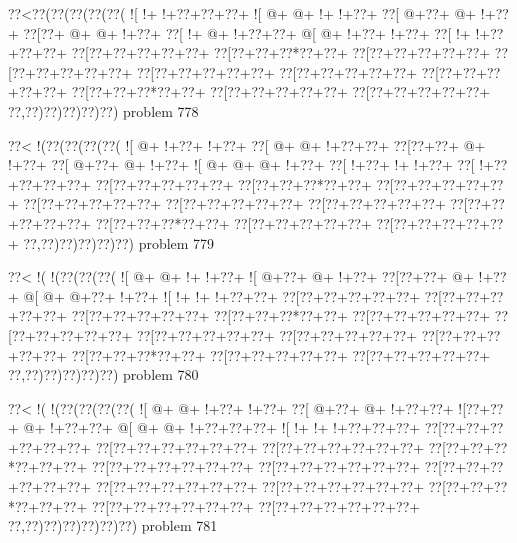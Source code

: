 \vbox{\vbox{\goo
\0??<\0??(\0??(\0??(\0??(\0??(
\- ![\- !+\- !+\0??+\0??+\0??+
\- ![\- @+\- @+\- !+\- !+\0??+
\0??[\- @+\0??+\- @+\- !+\0??+
\0??[\0??+\- @+\- @+\- !+\0??+
\0??[\- !+\- @+\- !+\0??+\0??+
\- @[\- @+\- !+\0??+\- !+\0??+
\0??[\- !+\- !+\0??+\0??+\0??+
\0??[\0??+\0??+\0??+\0??+\0??+
\0??[\0??+\0??+\0??*\0??+\0??+
\0??[\0??+\0??+\0??+\0??+\0??+
\0??[\0??+\0??+\0??+\0??+\0??+
\0??[\0??+\0??+\0??+\0??+\0??+
\0??[\0??+\0??+\0??+\0??+\0??+
\0??[\0??+\0??+\0??+\0??+\0??+
\0??[\0??+\0??+\0??*\0??+\0??+
\0??[\0??+\0??+\0??+\0??+\0??+
\0??[\0??+\0??+\0??+\0??+\0??+
\0??,\0??)\0??)\0??)\0??)\0??)
}
\hfil problem 778\hfil\break
}

\vbox{\vbox{\goo
\0??<\- !(\0??(\0??(\0??(\0??(
\- ![\- @+\- !+\0??+\- !+\0??+
\0??[\- @+\- @+\- !+\0??+\0??+
\0??[\0??+\0??+\- @+\- !+\0??+
\0??[\- @+\0??+\- @+\- !+\0??+
\- ![\- @+\- @+\- @+\- !+\0??+
\0??[\- !+\0??+\- !+\- !+\0??+
\0??[\- !+\0??+\0??+\0??+\0??+
\0??[\0??+\0??+\0??+\0??+\0??+
\0??[\0??+\0??+\0??*\0??+\0??+
\0??[\0??+\0??+\0??+\0??+\0??+
\0??[\0??+\0??+\0??+\0??+\0??+
\0??[\0??+\0??+\0??+\0??+\0??+
\0??[\0??+\0??+\0??+\0??+\0??+
\0??[\0??+\0??+\0??+\0??+\0??+
\0??[\0??+\0??+\0??*\0??+\0??+
\0??[\0??+\0??+\0??+\0??+\0??+
\0??[\0??+\0??+\0??+\0??+\0??+
\0??,\0??)\0??)\0??)\0??)\0??)
}
\hfil problem 779\hfil\break
}

\vbox{\vbox{\goo
\0??<\- !(\- !(\0??(\0??(\0??(
\- ![\- @+\- @+\- !+\- !+\0??+
\- ![\- @+\0??+\- @+\- !+\0??+
\0??[\0??+\0??+\- @+\- !+\0??+
\- @[\- @+\- @+\0??+\- !+\0??+
\- ![\- !+\- !+\- !+\0??+\0??+
\0??[\0??+\0??+\0??+\0??+\0??+
\0??[\0??+\0??+\0??+\0??+\0??+
\0??[\0??+\0??+\0??+\0??+\0??+
\0??[\0??+\0??+\0??*\0??+\0??+
\0??[\0??+\0??+\0??+\0??+\0??+
\0??[\0??+\0??+\0??+\0??+\0??+
\0??[\0??+\0??+\0??+\0??+\0??+
\0??[\0??+\0??+\0??+\0??+\0??+
\0??[\0??+\0??+\0??+\0??+\0??+
\0??[\0??+\0??+\0??*\0??+\0??+
\0??[\0??+\0??+\0??+\0??+\0??+
\0??[\0??+\0??+\0??+\0??+\0??+
\0??,\0??)\0??)\0??)\0??)\0??)
}
\hfil problem 780\hfil\break
}

\vbox{\vbox{\goo
\0??<\- !(\- !(\0??(\0??(\0??(\0??(
\- ![\- @+\- @+\- !+\0??+\- !+\0??+
\0??[\- @+\0??+\- @+\- !+\0??+\0??+
\- ![\0??+\0??+\- @+\- !+\0??+\0??+
\- @[\- @+\- @+\- !+\0??+\0??+\0??+
\- ![\- !+\- !+\- !+\0??+\0??+\0??+
\0??[\0??+\0??+\0??+\0??+\0??+\0??+
\0??[\0??+\0??+\0??+\0??+\0??+\0??+
\0??[\0??+\0??+\0??+\0??+\0??+\0??+
\0??[\0??+\0??+\0??*\0??+\0??+\0??+
\0??[\0??+\0??+\0??+\0??+\0??+\0??+
\0??[\0??+\0??+\0??+\0??+\0??+\0??+
\0??[\0??+\0??+\0??+\0??+\0??+\0??+
\0??[\0??+\0??+\0??+\0??+\0??+\0??+
\0??[\0??+\0??+\0??+\0??+\0??+\0??+
\0??[\0??+\0??+\0??*\0??+\0??+\0??+
\0??[\0??+\0??+\0??+\0??+\0??+\0??+
\0??[\0??+\0??+\0??+\0??+\0??+\0??+
\0??,\0??)\0??)\0??)\0??)\0??)\0??)
}
\hfil problem 781\hfil\break
}


